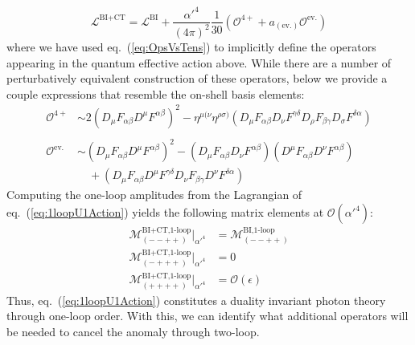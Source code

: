 \documentclass[11pt,letter]{article}
\def\eqn#1{eq.~(\ref{#1})}
\begin{document}
\begin{equation}
\label{eq:1loopU1Action}
\mathcal{L}^{\text{BI}+\text{CT}} = \mathcal{L}^{\text{BI}} + \frac{\alpha'^4}{(4\pi)^2}\frac{1}{30}\left(\mathcal{O}^{4+}+ a_{({\text{ev.}})}\mathcal{O}^{\text{ev.}}\right)
\end{equation}
where we have used \eqn{eq:OpsVsTens} to implicitly define the operators appearing in the quantum effective action above. While there are a number of perturbatively equivalent construction of these operators, below we provide a couple expressions that resemble the on-shell basis elements:
\begin{equation}
\begin{split} 
\mathcal{O}^{4+} &\sim 2 (D_\mu F_{\alpha \beta} D^\mu  F^{\alpha \beta})^2 - \eta^{\mu(\nu}\eta^{\rho\sigma)}(D_\mu F_{\alpha \beta} D_\nu  F^{\gamma\delta} D_\rho F_{\beta \gamma } D_\sigma F^{\delta \alpha})
\\\\
\mathcal{O}^{\text{ev.}} &\sim
(D_\mu F_{\alpha \beta} D^\mu  F^{\alpha \beta})^2 - (D_\mu F_{\alpha \beta} D_\nu  F^{\alpha \beta})(D^\mu F_{\alpha \beta} D^\nu  F^{\alpha \beta})
\\
&\quad +(D_\mu F_{\alpha \beta} D^\mu  F^{\gamma\delta} D_\nu F_{\beta \gamma } D^\nu F^{\delta \alpha})
\end{split}
\end{equation}
Computing the one-loop amplitudes from the Lagrangian of \eqn{eq:1loopU1Action} yields the following matrix elements at $\mathcal{O}(\alpha'^4)$:
\begin{align}
\mathcal{M}^{\text{BI+CT,1-loop}}_{(--++)}\big|_{\alpha'^4} &= \mathcal{M}^{\text{BI,1-loop}}_{(--++)}  
\\
 \mathcal{M}^{\text{BI+CT,1-loop}}_{(-+++)}\big|_{\alpha'^4} &= 0
 \\
 \mathcal{M}^{\text{BI+CT,1-loop}}_{(++++)}\big|_{\alpha'^4}  &= \mathcal{O}(\epsilon)
\end{align}
Thus, \eqn{eq:1loopU1Action} constitutes a duality invariant photon theory through one-loop order. With this, we can identify what additional operators will be needed to cancel the anomaly through two-loop. 
\end{document}
